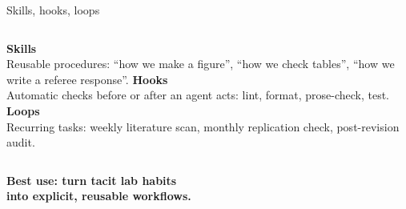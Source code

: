 \begin{frame}{Skills, hooks, loops}
  \begin{columns}[T,onlytextwidth]
      \textbf{Skills}\\[0.15cm]
      Reusable procedures: ``how we make a figure'', ``how we check tables'', ``how we write a referee response''.
      \textbf{Hooks}\\[0.15cm]
      Automatic checks before or after an agent acts: lint, format, prose-check, test.
      \textbf{Loops}\\[0.15cm]
      Recurring tasks: weekly literature scan, monthly replication check, post-revision audit.
  \end{columns}
  \vspace{0.6cm}
  \begin{center}\Large\color{deepblue}\bfseries Best use: turn tacit lab habits\\into explicit, reusable workflows.\end{center}
\end{frame}

